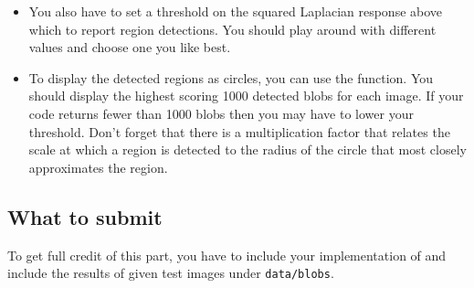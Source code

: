 \begin{itemize}
\item You also have to set a threshold on the squared Laplacian response above which to report region detections. You should play around with different values and choose one you like best.


\item To display the detected regions as circles, you can use the  function. You should display the highest scoring 1000 detected blobs for each image. If your code returns fewer than 1000 blobs then you may have to lower your threshold. Don't forget that there is a multiplication factor that relates the scale at which a region is detected to the radius of the circle that most closely approximates the region.
\end{itemize}


\subsection{What to submit}
To get full credit of this part, you have to
include your implementation of  and include the results of given test images under \texttt{data/blobs}.






